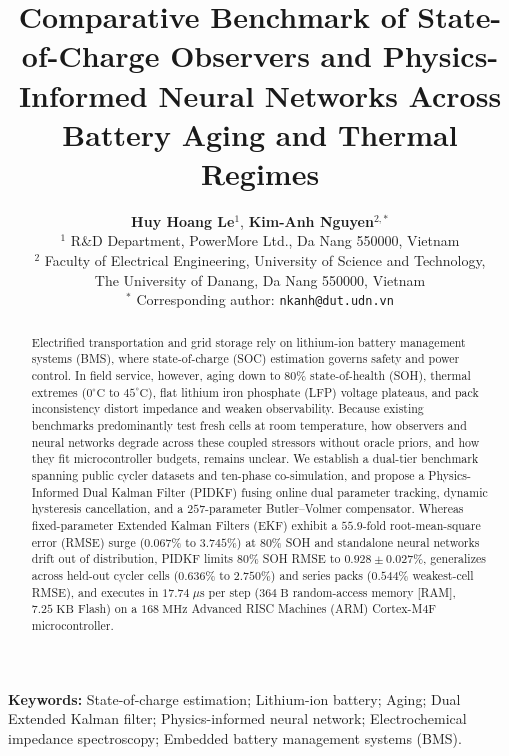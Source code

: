 \documentclass[10pt,a4paper]{article}
\title{\LARGE \textbf{Comparative Benchmark of State-of-Charge Observers and Physics-Informed Neural Networks Across Battery Aging and Thermal Regimes}}
\author{
  \textbf{Huy Hoang Le}$^{1}$, \textbf{Kim-Anh Nguyen}$^{2,*}$\\[0.6em]
  \small $^{1}$ R\&D Department, PowerMore Ltd., Da Nang 550000, Vietnam\\[0.2em]
  \small $^{2}$ Faculty of Electrical Engineering, University of Science and Technology,\\
  \small The University of Danang, Da Nang 550000, Vietnam\\[0.3em]
  \small $^{*}$ Corresponding author: \texttt{nkanh@dut.udn.vn}
}
\date{}
\providecommand{\upmu}{\mu}
\begin{document}
\maketitle

\begin{abstract}
Electrified transportation and grid storage rely on lithium-ion battery management systems (BMS), where state-of-charge (SOC) estimation governs safety and power control. In field service, however, aging down to $80\%$ state-of-health (SOH), thermal extremes ($0^\circ\text{C}$ to $45^\circ\text{C}$), flat lithium iron phosphate (LFP) voltage plateaus, and pack inconsistency distort impedance and weaken observability. Because existing benchmarks predominantly test fresh cells at room temperature, how observers and neural networks degrade across these coupled stressors without oracle priors, and how they fit microcontroller budgets, remains unclear. We establish a dual-tier benchmark spanning public cycler datasets and ten-phase co-simulation, and propose a Physics-Informed Dual Kalman Filter (PIDKF) fusing online dual parameter tracking, dynamic hysteresis cancellation, and a $257$-parameter Butler--Volmer compensator. Whereas fixed-parameter Extended Kalman Filters (EKF) exhibit a $55.9$-fold root-mean-square error (RMSE) surge ($0.067\%$ to $3.745\%$) at $80\%$ SOH and standalone neural networks drift out of distribution, PIDKF limits $80\%$ SOH RMSE to $0.928\pm0.027\%$, generalizes across held-out cycler cells ($0.636\%$ to $2.750\%$) and series packs ($0.544\%$ weakest-cell RMSE), and executes in $17.74\;\upmu\mathrm{s}$ per step ($364\;\mathrm{B}$ random-access memory [RAM], $7.25\;\mathrm{KB}$ Flash) on a $168\;\mathrm{MHz}$ Advanced RISC Machines (ARM) Cortex-M4F microcontroller.
\end{abstract}

\vspace{0.8em}
\noindent \textbf{Keywords:} State-of-charge estimation; Lithium-ion battery; Aging; Dual Extended Kalman filter; Physics-informed neural network; Electrochemical impedance spectroscopy; Embedded battery management systems (BMS).
\vspace{1.2em}
\end{document}

